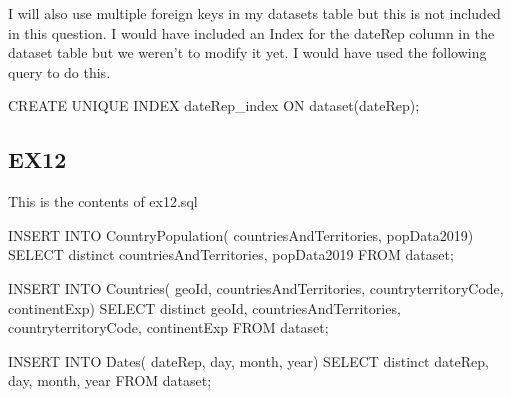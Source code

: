 \documentclass{report}
\begin{document}
	I will also use multiple foreign keys in my datasets table but this is not included in this question.
	\newline\newline
	I would have included an Index for the dateRep column in the dataset table but we weren't to modify it yet. I would have used the following query to do this.\newline
	
	CREATE UNIQUE INDEX dateRep\_index ON dataset(dateRep);
	
	
	\subsection{EX12}
	
	This is the contents of ex12.sql\newline
	
	INSERT INTO CountryPopulation(\newline
	countriesAndTerritories,\newline
	popData2019) \newline
	SELECT distinct \newline
	countriesAndTerritories, \newline
	popData2019\newline
	FROM dataset;\newline
	
	INSERT INTO Countries(\newline
	geoId,\newline
	countriesAndTerritories,\newline
	countryterritoryCode,\newline
	continentExp)\newline
	SELECT distinct \newline
	geoId,\newline
	countriesAndTerritories,\newline
	countryterritoryCode,\newline
	continentExp\newline
	FROM dataset;\newline
	
	INSERT INTO Dates(\newline
	dateRep,\newline
	day,\newline
	month,\newline
	year)\newline
	SELECT distinct \newline
	dateRep,\newline
	day,\newline
	month,\newline
	year\newline
	FROM dataset;\newline
	
\end{document}
